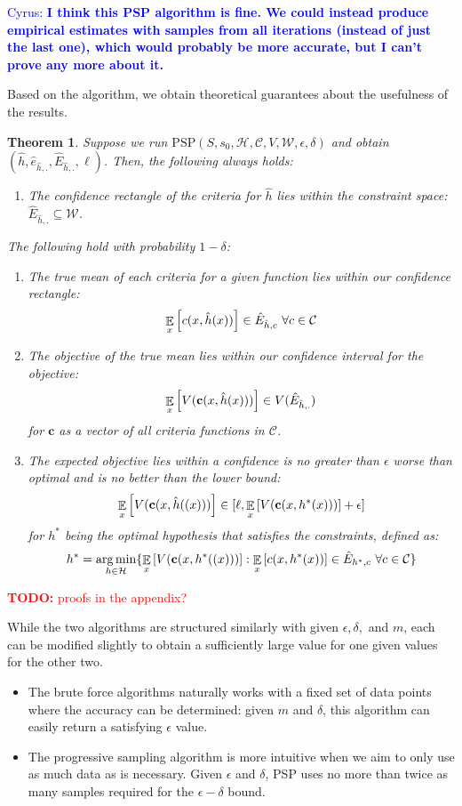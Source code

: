 \documentclass{article}
\newtheorem{theorem}{Theorem}[section]
\newcommand{\expectation}[2][]{\mathop{\mathbb{E}}\displaylimits_{#1}\left[ #2 \right]}
\newcommand\todo[1]{\textcolor{red}{\textbf{TODO:} #1}}
\DeclareMathOperator*{\argmin}{arg\,min}
\newcommand{\cc}[1]{\textcolor{blue}{Cyrus: \textbf{#1}}}
\begin{document}
{\cc{I think this PSP algorithm is fine.  We could instead produce empirical estimates with samples from all iterations (instead of just the last one), which would probably be more accurate, but I can't prove any more about it.}

Based on the algorithm, we obtain theoretical guarantees about the usefulness of the results.

\begin{theorem}
    Suppose we run $\text{PSP}(S, s_0, \mathcal{H}, \mathcal{C}, V, \mathcal{W}, \epsilon, \delta)$ and obtain $(\hat{h}, \hat{e}_{\hat{h},.}, \hat{E}_{\hat{h},.}, \ell)$. Then, the following always holds:
    \begin{enumerate}
        \item The confidence rectangle of the criteria for $\hat{h}$ lies within the constraint space: $\hat{E}_{\hat{h},.} \subseteq \mathcal{W}$.
    \end{enumerate}
    The following hold with probability $1 - \delta$:
    \begin{enumerate}[resume]
        \item The true mean of each criteria for a given function lies within our confidence rectangle: 
        \[\expectation[x]{c(x,\hat{h}(x))} \in \hat{E}_{\hat{h}, c} \ \forall c \in \mathcal{C}\]
        \item The objective of the true mean lies within our confidence interval for the objective:
        \[\expectation[x]{V(\textbf{c}(x,\hat{h}(x)))} \in V(\hat{E}_{\hat{h},.})\] 
        for $\textbf{c}$ as a vector of all criteria functions in $\mathcal{C}$.
        \item The expected objective lies within a confidence is no greater than $\epsilon$ worse than optimal and is no better than the lower bound: 
        \[\expectation[x]{V(\textbf{c}(x,\hat{h}((x)))} \in[\ell, \expectation[x]{V(\textbf{c}(x,h^*(x)))} + \epsilon]\]
        for $h^*$ being the optimal hypothesis that satisfies the constraints, defined as: \[h^* = \argmin_{h \in \mathcal{H}}\{\expectation[x]{V(\textbf{c}(x,h^*((x)))}: \expectation[x]{c(x,h^*(x))} \in \hat{E}_{h^*, c} \ \forall c \in \mathcal{C} \}\]
    \end{enumerate}
\end{theorem}

\todo{proofs in the appendix?}

While the two algorithms are structured similarly with given $\epsilon, \delta,$ and $m$, each can be modified slightly to obtain a sufficiently large value for one given values for the other two. 
\begin{itemize}
    \item The brute force algorithms naturally works with a fixed set of data points where the accuracy can be determined: given $m$ and $\delta$, this algorithm can easily return a satisfying $\epsilon$ value.
    \item The progressive sampling algorithm is more intuitive when we aim to only use as much data as is necessary. Given $\epsilon$ and $\delta$, PSP uses no more than twice as many samples required for the $\epsilon-\delta$ bound.
\end{itemize}

}
\end{document}
